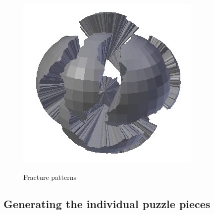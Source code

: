 \documentclass[acmlarge,screen,dvipsnames]{acmart}
\begin{document}
\begin{figure}[htb]
  \hspace{0.2in}%
  {\includegraphics[width=0.30\linewidth]{images/fracturehighestamplitude}}%
  \hspace*{0.1in}%
  \caption{\label{fig:fracture-type-examples}%
    Fracture patterns}
\end{figure}

\greenEnd
\subsection{Generating the individual puzzle pieces}
\label{sec:fragment-generation}
\end{document}
